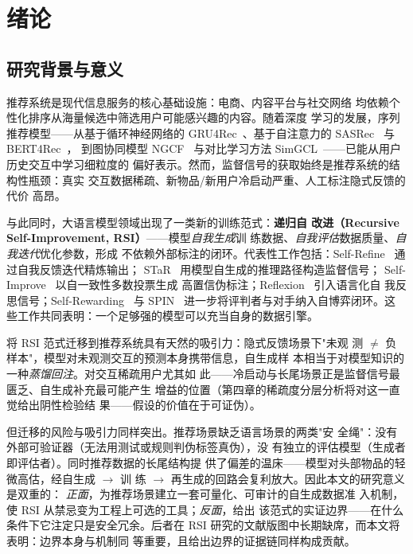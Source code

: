 \chapter{绪论}\label{ch:intro}

\section{研究背景与意义}
推荐系统是现代信息服务的核心基础设施：电商、内容平台与社交网络
均依赖个性化排序从海量候选中筛选用户可能感兴趣的内容。随着深度
学习的发展，序列推荐模型——从基于循环神经网络的
GRU4Rec~\cite{hidasi2016gru4rec}、基于自注意力的
SASRec~\cite{kang2018sasrec} 与 BERT4Rec~\cite{sun2019bert4rec}，
到图协同模型 NGCF~\cite{wang2019ngcf} 与对比学习方法
SimGCL~\cite{yu2022simgcl}——已能从用户历史交互中学习细粒度的
偏好表示。然而，监督信号的获取始终是推荐系统的结构性瓶颈：真实
交互数据稀疏、新物品/新用户冷启动严重、人工标注隐式反馈的代价
高昂。

与此同时，大语言模型领域出现了一类新的训练范式：\textbf{递归自
改进（Recursive Self-Improvement, RSI）}——模型\emph{自我生成}训
练数据、\emph{自我评估}数据质量、\emph{自我迭代}优化参数，形成
不依赖外部标注的闭环。代表性工作包括：Self-Refine~\cite%
{madaan2023selfrefine} 通过自我反馈迭代精炼输出；
STaR~\cite{zelikman2022star} 用模型自生成的推理路径构造监督信号；
Self-Improve~\cite{huang2023selfimprove} 以自一致性多数投票生成
高置信伪标注；Reflexion~\cite{shinn2023reflexion} 引入语言化自
我反思信号；Self-Rewarding~\cite{yuan2024selfrewarding} 与
SPIN~\cite{chen2024spin} 进一步将评判者与对手纳入自博弈闭环。这
些工作共同表明：一个足够强的模型可以充当自身的数据引擎。

将 RSI 范式迁移到推荐系统具有天然的吸引力：隐式反馈场景下"未观
测 $\neq$ 负样本"，模型对未观测交互的预测本身携带信息，自生成样
本相当于对模型知识的一种\emph{蒸馏回注}。对交互稀疏用户尤其如
此——冷启动与长尾场景正是监督信号最匮乏、自生成补充最可能产生
增益的位置（第四章的稀疏度分层分析将对这一直觉给出阴性检验结
果——假设的价值在于可证伪）。

但迁移的风险与吸引力同样突出。推荐场景缺乏语言场景的两类"安
全绳"：没有外部可验证器（无法用测试或规则判伪标签真伪），没
有独立的评估模型（生成者即评估者）。同时推荐数据的长尾结构提
供了偏差的温床——模型对头部物品的轻微高估，经自生成 $\to$ 训
练 $\to$ 再生成的回路会复利放大。因此本文的研究意义是双重的：
\emph{正面}，为推荐场景建立一套可量化、可审计的自生成数据准
入机制，使 RSI 从禁忌变为工程上可选的工具；\emph{反面}，给出
该范式的实证边界——在什么条件下它注定只是安全冗余。后者在
RSI 研究的文献版图中长期缺席，而本文将表明：边界本身与机制同
等重要，且给出边界的证据链同样构成贡献。

